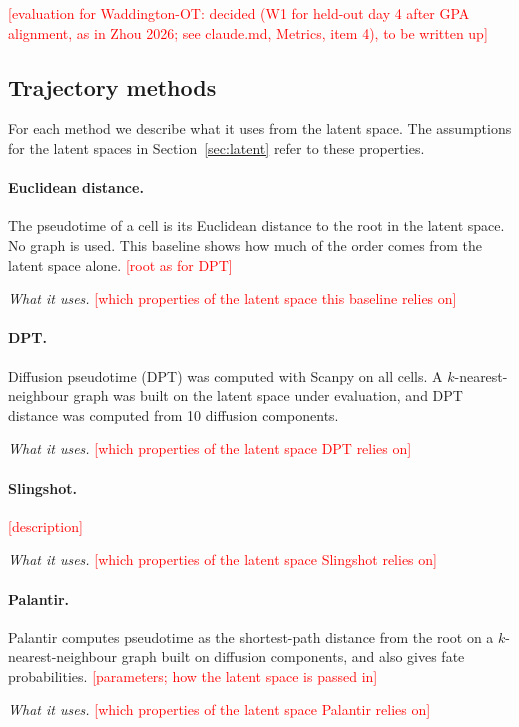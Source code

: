 \documentclass[12pt,a4paper]{article}
\newcommand{\todo}[1]{\textcolor{red}{[#1]}}
\begin{document}
\todo{evaluation for Waddington-OT: decided (W1 for held-out day 4 after GPA alignment, as in Zhou 2026; see claude.md, Metrics, item 4), to be written up}

\subsection{Trajectory methods}
For each method we describe what it uses from the latent space. The assumptions for the latent
spaces in Section~\ref{sec:latent} refer to these properties.

\paragraph{Euclidean distance.}
The pseudotime of a cell is its Euclidean distance to the root in the latent space. No graph is
used. This baseline shows how much of the order comes from the latent space alone.
\todo{root as for DPT}

\emph{What it uses.} \todo{which properties of the latent space this baseline relies on}

\paragraph{DPT.}
Diffusion pseudotime (DPT) \cite{haghverdi2016diffusion} was computed with Scanpy on all cells.
A $k$-nearest-neighbour graph was built on the latent space under evaluation, and DPT
distance was computed from 10 diffusion components.

\emph{What it uses.} \todo{which properties of the latent space DPT relies on}

\paragraph{Slingshot.}
\todo{description}

\emph{What it uses.} \todo{which properties of the latent space Slingshot relies on}

\paragraph{Palantir.}
Palantir \cite{setty2019palantir} computes pseudotime as the shortest-path distance from the root
on a $k$-nearest-neighbour graph built on diffusion components, and also gives fate probabilities.
\todo{parameters; how the latent space is passed in}

\emph{What it uses.} \todo{which properties of the latent space Palantir relies on}
\end{document}
